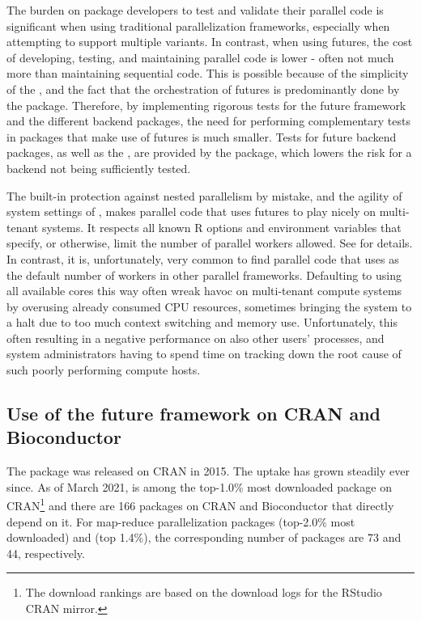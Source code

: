 The burden on package developers to test and validate their parallel
code is significant when using traditional parallelization frameworks,
especially when attempting to support multiple variants.  In contrast,
when using futures, the cost of developing, testing, and maintaining
parallel code is lower - often not much more than maintaining
sequential code.  This is possible because of the simplicity of the
, and the fact that the orchestration of futures is
predominantly done by the  package.  Therefore, by
implementing rigorous tests for the future framework and the different
backend packages, the need for performing complementary tests in
packages that make use of futures is much smaller.  Tests for future
backend packages, as well as the , are provided by
the  package, which lowers the risk for a backend
not being sufficiently tested.

The built-in protection against nested parallelism by mistake, and the
agility of system settings of , makes parallel
code that uses futures to play nicely on multi-tenant systems.  It
respects all known R options and environment variables that specify,
or otherwise, limit the number of parallel workers allowed.
See  for
details.  In contrast, it is, unfortunately, very common to find
parallel code that uses  as the default
number of workers in other parallel frameworks.  Defaulting to using
all available cores this way often wreak havoc on multi-tenant compute
systems by overusing already consumed CPU resources, sometimes
bringing the system to a halt due to too much context switching and
memory use.  Unfortunately, this often resulting in a negative
performance on also other users' processes, and system administrators
having to spend time on tracking down the root cause of such poorly
performing compute hosts.


\subsection{Use of the future framework on CRAN and Bioconductor}
\label{use-of-the-future-framework}

The  package was released on CRAN in 2015. The uptake has
grown steadily ever since.  As of March 2021,  is among
the top-1.0\% most downloaded package on CRAN\footnote{The download
rankings are based on the download logs for the RStudio CRAN mirror.}
and there are 166 packages on CRAN and Bioconductor that directly
depend on it.  For map-reduce parallelization
packages  (top-2.0\% most downloaded)
and  (top 1.4\%), the corresponding number of packages are
73 and 44, respectively.

